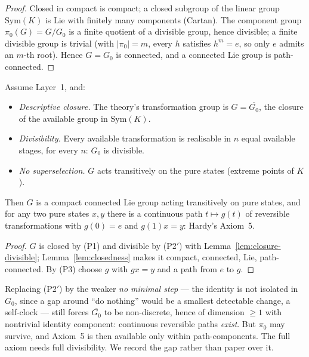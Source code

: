 \begin{proof}
Closed in compact is compact; a closed subgroup of the linear group $\mathrm{Sym}(K)$ is
Lie with finitely many components (Cartan). The component group $\pi_0(G) = G/G_0$ is a
finite quotient of a divisible group, hence divisible; a finite divisible group is
trivial (with $|\pi_0| = m$, every $h$ satisfies $h^m = e$, so only $e$ admits an $m$-th
root). Hence $G = G_0$ is connected, and a connected Lie group is path-connected.
\end{proof}

\begin{theorem}\label{thm:conditional}
Assume Layer~1, and:
\begin{itemize}
\item[\textup{(P1)}] \emph{Descriptive closure.} The theory's transformation group is
$G = \overline{G_0}$, the closure of the available group in $\mathrm{Sym}(K)$.
\item[\textup{(P2$'$)}] \emph{Divisibility.} Every available transformation is realisable
in $n$ equal available stages, for every $n$: $G_0$ is divisible.
\item[\textup{(P3)}] \emph{No superselection.} $G$ acts transitively on the pure states
(extreme points of $K$).
\end{itemize}
Then $G$ is a compact connected Lie group acting transitively on pure states, and for any
two pure states $x, y$ there is a continuous path $t \mapsto g(t)$ of reversible
transformations with $g(0) = e$ and $g(1)x = y$: Hardy's Axiom~5.
\end{theorem}

\begin{proof}
$G$ is closed by (P1) and divisible by (P2$'$) with Lemma~\ref{lem:closure-divisible};
Lemma~\ref{lem:closedness} makes it compact, connected, Lie, path-connected. By (P3)
choose $g$ with $gx = y$ and a path from $e$ to $g$.
\end{proof}

\begin{remark}\label{rem:fallback}
Replacing (P2$'$) by the weaker \emph{no minimal step} --- the identity is not isolated in
$G_0$, since a gap around ``do nothing'' would be a smallest detectable change, a
self-clock --- still forces $\overline{G_0}$ to be non-discrete, hence of dimension
$\ge 1$ with nontrivial identity component: continuous reversible paths \emph{exist}. But
$\pi_0$ may survive, and Axiom~5 is then available only within path-components. The full
axiom needs full divisibility. We record the gap rather than paper over it.
\end{remark}

